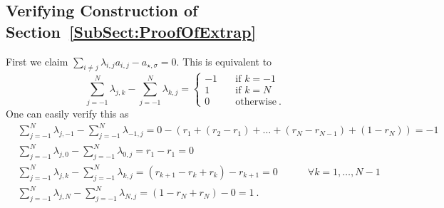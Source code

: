 \documentclass[11pt]{article}
\numberwithin{equation}{section}
\theoremstyle{definition}
\theoremstyle{definition}
\theoremstyle{definition}
\newcommand{\1}{\mathbf{1}}
\newcommand{\idxSpecial}{\sigma}
\begin{document}
    {\small
    
    
    }
    \appendix
{}
{}
\renewcommand{\thesubsection}{A.\arabic{subsection}}
\renewcommand{\theequation}{A.\arabic{equation}}
\renewcommand{\thethm}{A.\arabic{thm}}
\setcounter{equation}{0}
\setcounter{section}{0}
\setcounter{thm}{0}

\setcounter{tocdepth}{1}

\subsection{Verifying Construction of Section~\ref{SubSect:ProofOfExtrap}}\label{App:ScIdentity}
First we claim $\sum_{i\neq j} \lambda_{i,j} a_{i,j} - a_{\star,\idxSpecial} = 0$. This is equivalent to 
\begin{equation*}
    \sum_{j=-1}^N \lambda_{j,k} - \sum_{j=-1}^N \lambda_{k,j} = \begin{cases}
        -1 \quad & \text{if } k=-1 \\
        1 \quad & \text{if } k=N \\
        0 \quad & \text{otherwise} \ .
    \end{cases}
\end{equation*}
One can easily verify this as
\begin{align*}
    & \sum_{j=-1}^N \lambda_{j,-1} - \sum_{j=-1}^N \lambda_{-1,j} = 0 - \left(r_1 + (r_2-r_1) + \dots + (r_N-r_{N-1}) + (1-r_N) \right) = -1 \\
    & \sum_{j=-1}^N \lambda_{j,0} - \sum_{j=-1}^N \lambda_{0,j} = r_1 - r_1 = 0 \\
    & \sum_{j=-1}^N \lambda_{j,k} - \sum_{j=-1}^N \lambda_{k,j} = (r_{k+1}-r_k + r_k) - r_{k+1} = 0 \quad \quad \quad \forall k=1,\dots,N-1 \\
    & \sum_{j=-1}^N \lambda_{j,N} - \sum_{j=-1}^N \lambda_{N,j} = (1-r_N + r_N) - 0 = 1 \ .
\end{align*}
\end{document}
